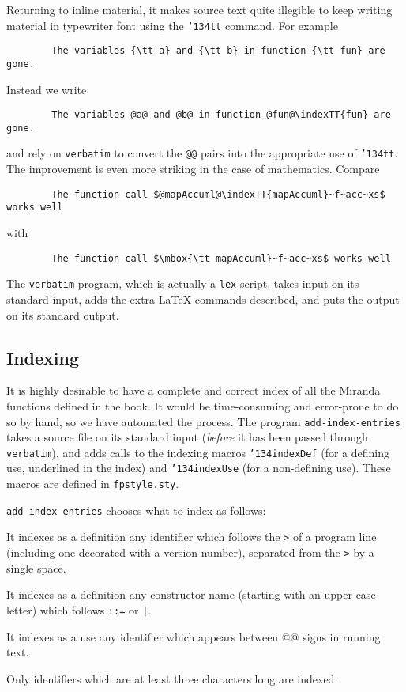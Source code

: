 Returning to inline material, it makes source text quite illegible to keep
writing material in typewriter font using the \mbox{\tt {\char'134}tt} command.  For example
\begin{verbatim}
        The variables {\tt a} and {\tt b} in function {\tt fun} are gone.
\end{verbatim}
Instead we write
\begin{verbatim}
        The variables @a@ and @b@ in function @fun@\indexTT{fun} are gone.
\end{verbatim}
and rely on \mbox{\tt verbatim} to convert the {\tt @@} pairs
into the appropriate use of \mbox{\tt {\char'134}tt}.  The improvement is even more striking
in the case of mathematics.  Compare
\begin{verbatim}
        The function call $@mapAccuml@\indexTT{mapAccuml}~f~acc~xs$ works well
\end{verbatim}
with
\begin{verbatim}
        The function call $\mbox{\tt mapAccuml}~f~acc~xs$ works well
\end{verbatim}
The \mbox{\tt verbatim} program, which is actually a \mbox{\tt lex} script, takes input on
its standard input, adds the extra \LaTeX{} commands described, and puts the
output on its standard output.

\subsection{Indexing}

It is highly desirable to have a complete and correct index of all
the Miranda functions defined in the book.  It would be time-consuming and
error-prone to do so by hand, so we have automated the process.  The program
\mbox{\tt add-index-entries} takes a source file on its standard input ({\em before}
it has been passed through \mbox{\tt verbatim}), and adds calls to the
indexing macros \mbox{\tt {\char'134}indexDef} (for a defining use, underlined in the
index) and \mbox{\tt {\char'134}indexUse} (for a non-defining use).
These macros are defined in \mbox{\tt fpstyle.sty}.

\mbox{\tt add-index-entries} chooses what to index as follows:
\begin{description}
\item[Function and type definitions.]
It indexes as a definition
any identifier which follows the \mbox{\tt >} of a program line
(including one decorated with a version number), separated from the \mbox{\tt >}
by a single space.
\item[Constructor definitions.]
It indexes as a definition any constructor name (starting with an upper-case
letter) which follows \mbox{\tt ::=} or \mbox{\tt |}.
\item
It indexes as a use any identifier which appears between @@ signs in
running text.
\item
Only identifiers which are at least three characters long are indexed.
\end{description}





